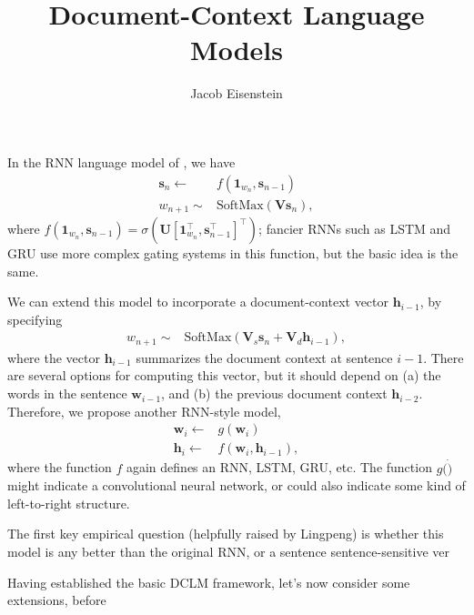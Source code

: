 \documentclass[11pt,a4paper]{article}
\title{Document-Context Language Models}
\author{Jacob Eisenstein}
\newcommand{\trans}[1]{#1^{\top}}
\renewcommand{\vec}[1]{\mathbf{#1}}
\newcommand{\vs}[0]{\vec{s}}
\newcommand{\vh}[0]{\vec{h}}
\newcommand{\vw}[0]{\vec{w}}
\newcommand{\va}[0]{\vec{w}}
\newcommand{\mat}[1]{\bm{#1}}
\begin{document}
\maketitle

In the RNN language model of , we have
\begin{align}
\vec{s}_n \leftarrow & f(\vec{1}_{w_n}, \vs_{n-1})\\
w_{n+1} \sim & \text{SoftMax}(\mat{V} \vec{s}_n),
\end{align}
where $f(\vec{1}_{w_n}, \vs_{n-1}) = \sigma(\mat{U} \trans{[\trans{\vec{1}}_{w_n}, \trans{\vec{s}}_{n-1}]})$; fancier RNNs such as LSTM and GRU use more complex gating systems in this function, but the basic idea is the same. 

We can extend this model to incorporate a document-context vector $\vh_{i-1}$, by specifying 
\begin{align}
w_{n+1} \sim & \text{SoftMax}(\mat{V}_s \vec{s}_n + \mat{V}_d \vh_{i-1}),
\end{align}
where the vector $\vh_{i-1}$ summarizes the document context at sentence $i-1$. There are several options for computing this vector, but it should depend on (a) the words in the sentence $\vw_{i-1}$, and (b) the previous document context $\vh_{i-2}$. Therefore, we propose another RNN-style model,
\begin{align}
\va_i \leftarrow & g(\vw_i) \\
\vh_i \leftarrow & f(\va_i, \vh_{i-1}),
\end{align}
where the function $f$ again defines an RNN, LSTM, GRU, etc. The function $g(\dot)$ might indicate a convolutional neural network, or could also indicate some kind of left-to-right structure. 

The first key empirical question (helpfully raised by Lingpeng) is whether this model is any better than the original RNN, or a sentence  sentence-sensitive ver

Having established the basic DCLM framework, let's now consider some extensions, before 



\end{document}
